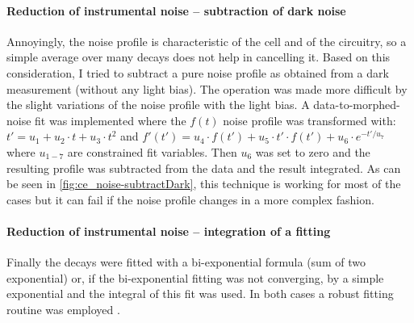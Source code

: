 	\paragraph{Reduction of instrumental noise -- subtraction of dark noise} Annoyingly, the noise profile is characteristic of the cell and of the circuitry, so a simple average over many decays does not help in cancelling it. Based on this consideration, I tried to subtract a pure noise profile as obtained from a dark measurement (without any light bias). The operation was made more difficult by the slight variations of the noise profile with the light bias. A data-to-morphed-noise fit was implemented where the $f(t)$ noise profile was transformed with: $t'= u_1 + u_2 \cdot t + u_3 \cdot t^2$ and $f'(t') = u_4 \cdot f(t') + u_5 \cdot t' \cdot f(t') + u_6 \cdot e^{-t'/u_7}$ where $u_{1-7}$ are constrained fit variables. Then $u_6$ was set to zero and the resulting profile was subtracted from the data and the result integrated. As can be seen in \cref{fig:ce_noise-subtractDark}, this technique is working for most of the cases but it can fail if the noise profile changes in a more complex fashion.
	
	
	\paragraph{Reduction of instrumental noise -- integration of a fitting} Finally the decays were fitted with a bi-exponential formula (sum of two exponential) or, if the bi-exponential fitting was not converging, by a simple exponential and the integral of this fit was used. In both cases a robust fitting routine was employed \cite{Maechler2018}.
	
